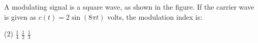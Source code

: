 \item A modulating signal is a square wave, as shown in the figure. If the carrier wave is given as $c(t) = 2 \sin(8\pi t)$ volts, the modulation index is:
        \begin{center}
        \end{center}
        \begin{tasks}(2)
            \task $\frac{1}{4}$
            \task $\frac{1}{2}$
            \task $\frac{1}{3}$
        \end{tasks}